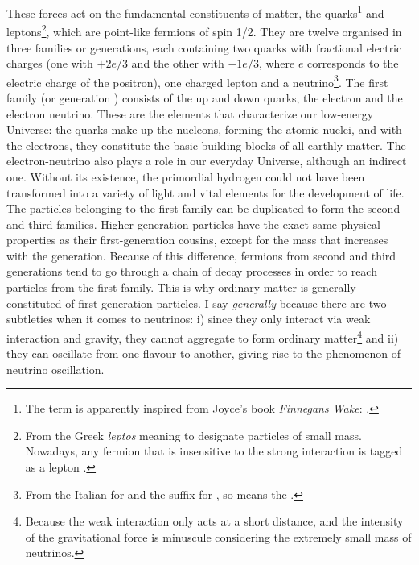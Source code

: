 These forces act on the fundamental constituents of matter, the quarks\footnote{The term is apparently inspired from Joyce's book \textit{Finnegans Wake}: \cite{s.glashowInteractionsJourneyMind1990}.} and leptons\footnote{From the Greek \textit{leptos} meaning  to designate particles of small mass. Nowadays, any fermion that is insensitive to the strong interaction is tagged as a lepton \cite{s.glashowInteractionsJourneyMind1990}.}, which are point-like fermions of spin 1/2. They are twelve organised in three families or generations, each containing two quarks with fractional electric charges (one with $+2 e /3$ and the other with $-1 e/3$, where $e$ corresponds to the electric charge of the positron), one charged lepton and a neutrino\footnote{From the Italian  for  and the suffix  for ,  so  means the  \cite{s.glashowInteractionsJourneyMind1990}.}. The first family (or generation ) consists of the up and down quarks, the electron and the electron neutrino. These are the elements that characterize our low-energy Universe: the quarks make up the nucleons, forming the atomic nuclei, and with the electrons, they constitute the basic building blocks of all earthly matter. The electron-neutrino also plays a role in our everyday Universe, although an indirect one. Without its existence, the primordial hydrogen could not have been transformed into a variety of light and vital elements \cite{kimElectronNeutrinoDegeneracyPrimordial1997} for the development of life. The particles belonging to the first family can be duplicated to form the second and third families. Higher-generation particles have the exact same physical properties as their first-generation cousins, except for the mass that increases with the generation. Because of this difference, fermions from second and third generations tend to go through a chain of decay processes in order to reach particles from the first family. This is why ordinary matter is generally constituted of first-generation particles. I say \textit{generally} because there are two subtleties when it comes to neutrinos: i) since they only interact via weak interaction and gravity, they cannot aggregate to form ordinary matter\footnote{Because the weak interaction only acts at a short distance, and the intensity of the gravitational force is minuscule considering the extremely small mass of neutrinos.} and ii) they can oscillate from one flavour to another, giving rise to the phenomenon of neutrino oscillation. 

